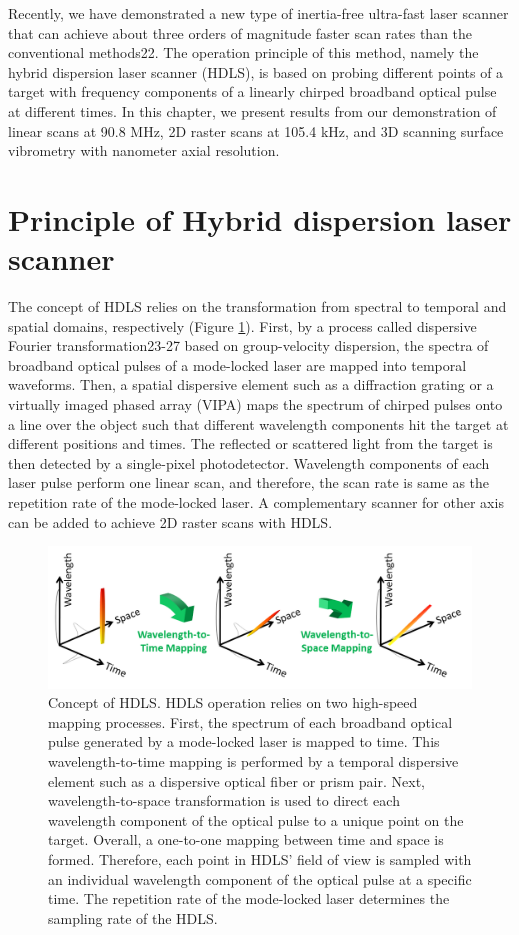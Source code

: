 Recently, we have demonstrated a new type of inertia-free ultra-fast laser scanner that can achieve about three orders of magnitude faster scan rates than the conventional methods22. The operation principle of this method, namely the hybrid dispersion laser scanner (HDLS), is based on probing different points of a target with frequency components of a linearly chirped broadband optical pulse at different times. In this chapter, we present results from our demonstration of linear scans at 90.8 MHz, 2D raster scans at 105.4 kHz, and 3D scanning surface vibrometry with nanometer axial resolution.

\section{Principle of Hybrid dispersion laser scanner}

The concept of HDLS relies on the transformation from spectral to temporal and spatial domains, respectively (Figure \ref{fig:PW2013_Figure1}). First, by a process called dispersive Fourier transformation23-27 based on group-velocity dispersion, the spectra of broadband optical pulses of a mode-locked laser are mapped into temporal waveforms. Then, a spatial dispersive element such as a diffraction grating or a virtually imaged phased array (VIPA) maps the spectrum of chirped pulses onto a line over the object such that different wavelength components hit the target at different positions and times. The reflected or scattered light from the target is then detected by a single-pixel photodetector. Wavelength components of each laser pulse perform one linear scan, and therefore, the scan rate is same as the repetition rate of the mode-locked laser. A complementary scanner for other axis can be added to achieve 2D raster scans with HDLS.

\begin{figure}[htb!]
\centering
\includegraphics[scale=1]{PW2013/Figure1.png}
\caption{Concept of HDLS. HDLS operation relies on two high-speed mapping processes. First, the spectrum of each broadband optical pulse generated by a mode-locked laser is mapped to time. This wavelength-to-time mapping is performed by a temporal dispersive element such as a dispersive optical fiber or prism pair. Next, wavelength-to-space transformation is used to direct each wavelength component of the optical pulse to a unique point on the target. Overall, a one-to-one mapping between time and space is formed. Therefore, each point in HDLS’ field of view is sampled with an individual wavelength component of the optical pulse at a specific time. The repetition rate of the mode-locked laser determines the sampling rate of the HDLS.}
\label{fig:PW2013_Figure1}
\end{figure}

